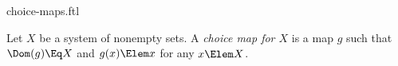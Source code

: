 \documentclass{stex}
\begin{document}
\begin{smodule}{choice-maps.ftl}



\begin{definition*}[forthel,for=choice map]
  Let $X$ be a system of nonempty sets.
  A \emph{choice map for $X$} is a map $g$ such that $\Dom(g) \Eq X$ and $g(x) \Elem x$ for any $x \Elem X$.
\end{definition*}

\end{smodule}
\end{document}
